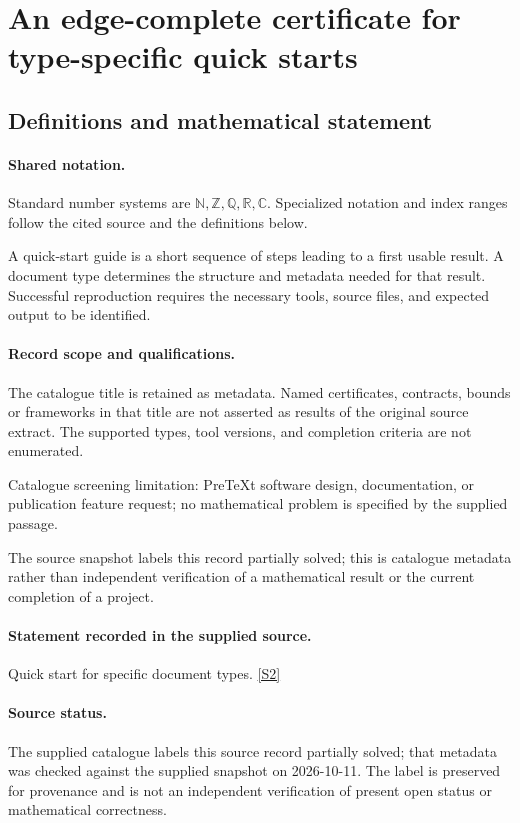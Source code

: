 \documentclass[11pt]{article}
\newcommand{\sref}[2]{\hyperlink{source:#1:#2}{[S#2]}}
\begin{document}
\section{An edge-complete certificate for type-specific quick starts}\label{statement}

\subsection{Definitions and mathematical statement}

\paragraph{Shared notation.}Standard number systems are $\mathbb N,\mathbb Z,\mathbb Q,\mathbb R,\mathbb C$. Specialized notation and index ranges follow the cited source and the definitions below.


A quick-start guide is a short sequence of steps leading to a first usable result. A document type determines the structure and metadata needed for that result. Successful reproduction requires the necessary tools, source files, and expected output to be identified.
\paragraph{Record scope and qualifications.}
The catalogue title is retained as metadata. Named certificates, contracts, bounds or frameworks in that title are not asserted as results of the original source extract.
The supported types, tool versions, and completion criteria are not enumerated.

Catalogue screening limitation: PreTeXt software design, documentation, or publication feature request; no mathematical problem is specified by the supplied passage.

The source snapshot labels this record partially solved; this is catalogue metadata rather than independent verification of a mathematical result or the current completion of a project.
\paragraph{Statement recorded in the supplied source.}
Quick start for specific document types. \sref{statement}{2}
\paragraph{Source status.}
The supplied catalogue labels this source record partially solved; that metadata was checked against the supplied snapshot on 2026-10-11. The label is preserved for provenance and is not an independent verification of present open status or mathematical correctness.
\end{document}
